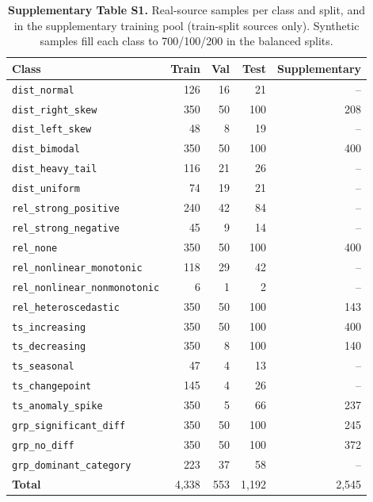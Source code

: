 \begin{table}[h]\centering\small
\caption*{\textbf{Supplementary Table S1.} Real-source samples per class and split, and in the supplementary training pool (train-split sources only). Synthetic samples fill each class to 700/100/200 in the balanced splits.}
\begin{tabular}{lrrrr}
\toprule
\textbf{Class} & \textbf{Train} & \textbf{Val} & \textbf{Test} & \textbf{Supplementary} \\
\midrule
\texttt{dist\_normal} & 126 & 16 & 21 & -- \\
\texttt{dist\_right\_skew} & 350 & 50 & 100 & 208 \\
\texttt{dist\_left\_skew} & 48 & 8 & 19 & -- \\
\texttt{dist\_bimodal} & 350 & 50 & 100 & 400 \\
\texttt{dist\_heavy\_tail} & 116 & 21 & 26 & -- \\
\texttt{dist\_uniform} & 74 & 19 & 21 & -- \\
\texttt{rel\_strong\_positive} & 240 & 42 & 84 & -- \\
\texttt{rel\_strong\_negative} & 45 & 9 & 14 & -- \\
\texttt{rel\_none} & 350 & 50 & 100 & 400 \\
\texttt{rel\_nonlinear\_monotonic} & 118 & 29 & 42 & -- \\
\texttt{rel\_nonlinear\_nonmonotonic} & 6 & 1 & 2 & -- \\
\texttt{rel\_heteroscedastic} & 350 & 50 & 100 & 143 \\
\texttt{ts\_increasing} & 350 & 50 & 100 & 400 \\
\texttt{ts\_decreasing} & 350 & 8 & 100 & 140 \\
\texttt{ts\_seasonal} & 47 & 4 & 13 & -- \\
\texttt{ts\_changepoint} & 145 & 4 & 26 & -- \\
\texttt{ts\_anomaly\_spike} & 350 & 5 & 66 & 237 \\
\texttt{grp\_significant\_diff} & 350 & 50 & 100 & 245 \\
\texttt{grp\_no\_diff} & 350 & 50 & 100 & 372 \\
\texttt{grp\_dominant\_category} & 223 & 37 & 58 & -- \\
\midrule
\textbf{Total} & 4,338 & 553 & 1,192 & 2,545 \\
\bottomrule
\end{tabular}
\end{table}

